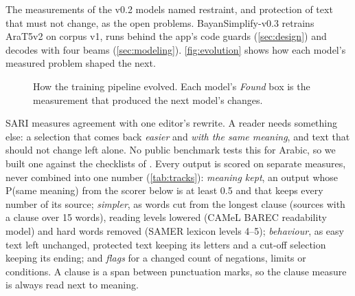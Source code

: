 \documentclass[10pt,a4paper]{article}
\newcommand{\vThree}{BayanSimplify-v0.3}
\begin{document}
\lead{\vThree{}.} The measurements of the v0.2 models named restraint, and
protection of text that must not change, as the open problems. \vThree{} retrains
AraT5v2 on corpus v1, runs behind the app's code guards (\autoref{sec:design}) and
decodes with four beams (\autoref{sec:modeling}). \autoref{fig:evolution} shows how
each model's measured problem shaped the next.

\begin{figure}[h]
\centering
\resizebox{\linewidth}{!}{\figevolution}
\caption{How the training pipeline evolved. Each model's \emph{Found} box is the
measurement that produced the next model's changes.}
\label{fig:evolution}
\end{figure}

 SARI measures agreement with one
editor's rewrite. A reader needs something else: a selection that comes back
\emph{easier} and \emph{with the same meaning}, and text that should not change
left alone. No public benchmark tests this for Arabic, so we built one against the
checklists of \cite{bean2025,betterbench}. Every output is scored on separate
measures, never combined into one number (\autoref{tab:tracks}):
\emph{meaning kept}, an output whose P(same meaning) from the scorer below is at
least 0.5 and that keeps every number of its source; \emph{simpler}, as words cut
from the longest clause (sources with a clause over 15 words), reading levels
lowered (CAMeL BAREC readability model) and hard words removed (SAMER lexicon
levels 4--5); \emph{behaviour}, as easy text left unchanged, protected text
keeping its letters and a cut-off selection keeping its ending; and \emph{flags}
for a changed count of negations, limits or conditions. A clause is a span between
punctuation marks, so the clause measure is always read next to meaning.
\end{document}
